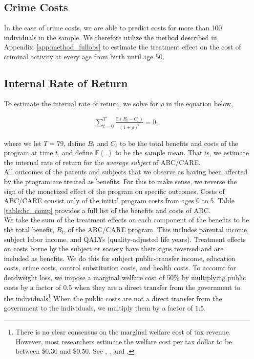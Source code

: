 \subsection{Crime Costs}

\noindent In the case of crime costs, we are able to predict costs for more than 100 individuals in the
sample. We therefore utilize the method described in Appendix~\ref{app:method_fullobs}
to estimate the treatment effect on the cost of criminal activity at every age from birth until age 50. \\

\subsection{Internal Rate of Return}
\label{app:method_irr}

\noindent To estimate the internal rate of return, we solve for $\rho$ in the equation below,

\begin{align}
\sum_{t=0}^T \frac{ \mathbb{E} (B_t - C_t)}{(1+\rho)^t} = 0,
\end{align}

\noindent where we let $T = 79$, define $B_t$ and $C_t$ to be the total benefits and costs of the program at time $t$, and define $\mathbb{E}(.)$ to be the sample mean. That is, we estimate the internal rate of return for the \textit{average subject} of ABC/CARE. \\

\noindent All outcomes of the parents and subjects that we observe as having been affected by the program are treated as benefits. For this to make sense, we reverse the sign of the monetized effect of the program on specific outcomes. Costs of ABC/CARE consist only of the initial program costs from ages 0 to 5. Table \ref{table:bc_comp} provides a full list of the benefits and costs of ABC. \\

\noindent We take the sum of the treatment effects on each component of the benefits to be the total benefit, $B_t$, of the ABC/CARE program. This includes parental income, subject labor income, and QALYs (quality-adjusted life years). Treatment effects on costs borne by the subject or society have their signs reversed and are included as benefits. We do this for subject public-transfer income, education costs, crime costs, control substitution costs, and health costs. To account for deadweight loss, we impose a marginal welfare cost of 50\% by multiplying public costs by a factor of $0.5$ when they are a direct transfer from the government to the individuals\footnote{There is no clear consensus on the marginal welfare cost of tax revenue. However, most researchers estimate the welfare cost per tax dollar to be between \$0.30 and \$0.50. See \citet{Feldstein_1999_REStat}, \citet{Heckman_Smith_1998_evaluating}, and \citet{Browning_1987_AER}.} When the public costs are not a direct transfer from the government to the individuals, we multiply them by a factor of $1.5$.\\

